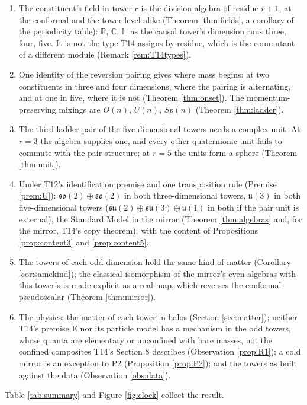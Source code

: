 \documentclass[11pt]{article}
\theoremstyle{definition}
\newcommand{\R}{\mathbb{R}}
\newcommand{\C}{\mathbb{C}}
\newcommand{\HH}{\mathbb{H}}
\newcommand{\su}{\mathfrak{su}}
\newcommand{\so}{\mathfrak{so}}
\newcommand{\uu}{\mathfrak{u}}
\begin{document}
\begin{enumerate}
\item The constituent's field in tower $r$ is the division algebra of residue $r + 1$, at the conformal and the tower level alike (Theorem \ref{thm:fields}, a corollary of the periodicity table): $\R$, $\C$, $\HH$ as the causal tower's dimension runs three, four, five. It is not the type T14 assigns by residue, which is the commutant of a different module (Remark \ref{rem:T14types}).
\item One identity of the reversion pairing gives where mass begins: at two constituents in three and four dimensions, where the pairing is alternating, and at one in five, where it is not (Theorem \ref{thm:onset}). The momentum-preserving mixings are $O(n)$, $U(n)$, $Sp(n)$ (Theorem \ref{thm:ladder}).
\item The third ladder pair of the five-dimensional towers needs a complex unit. At $r = 3$ the algebra supplies one, and every other quaternionic unit fails to commute with the pair structure; at $r = 5$ the units form a sphere (Theorem \ref{thm:unit}).
\item Under T12's identification premise and one transposition rule (Premise \ref{prem:U}): $\so(2) \oplus \so(2)$ in both three-dimensional towers, $\uu(3)$ in both five-dimensional towers ($\su(2) \oplus \su(3) \oplus \uu(1)$ in both if the pair unit is external), the Standard Model in the mirror (Theorem \ref{thm:algebras} and, for the mirror, T14's copy theorem), with the content of Propositions \ref{prop:content3} and \ref{prop:content5}.
\item The towers of each odd dimension hold the same kind of matter (Corollary \ref{cor:samekind}); the classical isomorphism of the mirror's even algebras with this tower's is made explicit as a real map, which reverses the conformal pseudoscalar (Theorem \ref{thm:mirror}).
\item The physics: the matter of each tower in halos (Section \ref{sec:matter}); neither T14's premise E nor its particle model has a mechanism in the odd towers, whose quanta are elementary or unconfined with bare masses, not the confined composites T14's Section 8 describes (Observation \ref{prop:R1}); a cold mirror is an exception to P2 (Proposition \ref{prop:P2}); and the towers as built against the data (Observation \ref{obs:data}).
\end{enumerate}

Table \ref{tab:summary} and Figure \ref{fig:clock} collect the result.
\end{document}
